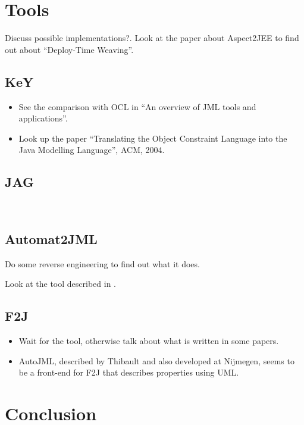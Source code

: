 \documentclass[a4paper,10pt]{article}
\begin{document}
\section{Tools}\label{sec:Tools}


Discuss possible implementations?. Look at the paper about Aspect2JEE to find
out about ``Deploy-Time Weaving''.

\subsection{KeY}\label{subsec:KeY}
\begin{itemize}
  \item See the comparison with OCL in ``An overview of JML tools and
applications''.
  \item Look up the paper ``Translating the Object Constraint Language into
the Java Modelling Language'', ACM, 2004.
\end{itemize}


\subsection{JAG}\label{subsec:JAG}
\
\subsection{Automat2JML}\label{subsec:Automat2JML}
Do some reverse engineering to find out what it does.

Look at the tool described in \cite{PaBaBu03}.

\subsection{F2J}\label{subsec:F2J}
\begin{itemize}
  \item Wait for the tool, otherwise talk about what is written in some papers.
  \item AutoJML, described by Thibault and also developed at Nijmegen, seems to
be a front-end for F2J that describes properties using UML.
\end{itemize}


\section{Conclusion}\label{sec:Conclusion}



\end{document}
